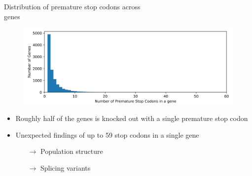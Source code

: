 \documentclass{beamer}
\begin{document}
\begin{frame}{Distribution of premature stop codons across \\ genes}
	\begin{figure}[tb]
		\centering
		\begin{minipage}[h]{1\textwidth}
		\centering
		\includegraphics[width=1\textwidth]{images/Distribution_Premature_Stop_CodonsII.png}
		\label{fig:Distribution_Premature_Stop_CodonsII}
		\end{minipage}
	\end{figure}
	\begin{itemize}
		\item Roughly half of the genes is knocked out with a single premature stop codon 
		\item Unexpected findings of up to 59 stop codons in a single gene
		\begin{itemize}
			\item[$\rightarrow$] Population structure
			\item[$\rightarrow$] Splicing variants 
		\end{itemize}
	\end{itemize}
\end{frame}
\end{document}
